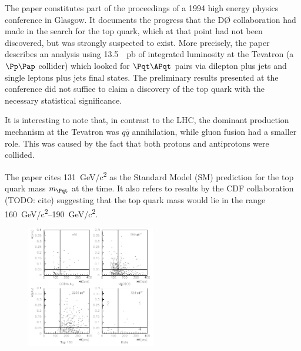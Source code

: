 




The paper constitutes part of the proceedings of a 1994 high energy physics conference in Glasgow.
It documents the progress that the DØ collaboration had made in the search for the top quark, which at that point had not been discovered, but was strongly suspected to exist.
More precisely, the paper describes an analysis using \SI{13.5}{\per\pico\barn} of integrated luminosity at the Tevatron (a $\Pp\Pap$ collider) which looked for $\Pqt\APqt$ pairs via dilepton plus jets and single leptons plus jets final states.
The preliminary results presented at the conference did not suffice to claim a discovery of the top quark with the necessary statistical significance.

It is interesting to note that, in contrast to the LHC, the dominant \Pqt\!\!\APqt production mechanism at the Tevatron was $q\overline{q}$ annihilation, while gluon fusion had a smaller role.
This was caused by the fact that both protons and antiprotons were collided.

The paper cites \SI{131}{GeV/c^2} as the Standard Model (SM) prediction for the top quark mass $m_{\Pqt}$ at the time.
It also refers to results by the CDF collaboration (TODO: cite) suggesting that the top quark mass would lie in the range \SIrange{160}{190}{GeV/c^2}.



\begin{figure}
  \centering
  \includegraphics[width=0.5\textwidth]{figures/candidates.pdf}
\end{figure}

